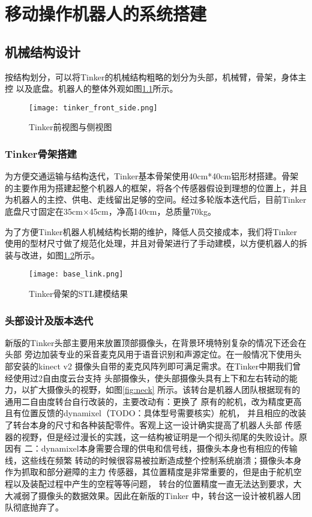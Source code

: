 
\chapter{移动操作机器人的系统搭建}
\label{cha:system}


\section{机械结构设计}

按结构划分，可以将Tinker的机械结构粗略的划分为头部，机械臂，骨架，身体主控
以及底盘。机器人的整体外观如图\ref{fig:tinker_front_side}所示。

\begin{figure}[ht] %
  \centering
  \texttt{[image: tinker\_front\_side.png]}
  \caption{Tinker前视图与侧视图}
  \label{fig:tinker_front_side}
\end{figure}

\subsection{Tinker骨架搭建}
为方便交通运输与结构迭代，Tinker基本骨架使用40cm*40cm铝形材搭建。骨架
的主要作用为搭建起整个机器人的框架，将各个传感器假设到理想的位置上，并且
为机器人的主控、供电、走线留出足够的空间。经过多轮版本迭代后，目前Tinker
底盘尺寸固定在35cm×45cm，净高140cm，总质量70kg。

为了方便Tinker机器人机械结构长期的维护，降低人员交接成本，我们将Tinker
使用的型材尺寸做了规范化处理，并且对骨架进行了手动建模，以方便机器人的拆
装与改进，如图\ref{fig:base_link}所示。

\begin{figure}[ht] %
  \centering
  \texttt{[image: base\_link.png]}
  \caption{Tinker骨架的STL建模结果}
  \label{fig:base_link}
\end{figure}

\subsection{头部设计及版本迭代}

新版的Tinker头部主要用来放置顶部摄像头，在背景环境特别复杂的情况下还会在头部
旁边加装专业的采音麦克风用于语音识别和声源定位。在一般情况下使用头部安装的kinect v2
摄像头自带的麦克风阵列即可满足需求。在Tinker中期我们曾经使用过2自由度云台支持
头部摄像头，使头部摄像头具有上下和左右转动的能力，以扩大摄像头的视野，如图\ref{fig:neck}
所示。该转台是机器人团队根据现有的通用二自由度转台自行改装的，主要改动有：更换了
原有的舵机，改为精度更高且有位置反馈的dynamixel（TODO：具体型号需要核实）舵机，
并且相应的改装了转台本身的尺寸和各种装配零件。客观上这一设计确实提高了机器人头部
传感器的视野，但是经过漫长的实践，这一结构被证明是一个彻头彻尾的失败设计。原因有
二：dynamixel本身需要合理的供电和信号线，摄像头本身也有相应的传输线，这些线在频繁
转动的时候很容易被拉断造成整个控制系统崩溃；摄像头本身作为抓取和部分避障的主力
传感器，其位置精度是非常重要的，但是由于舵机空程以及装配过程中产生的空程等等问题，
转台的位置精度一直无法达到要求，大大减弱了摄像头的数据效果。因此在新版的Tinker
中，转台这一设计被机器人团队彻底抛弃了。

